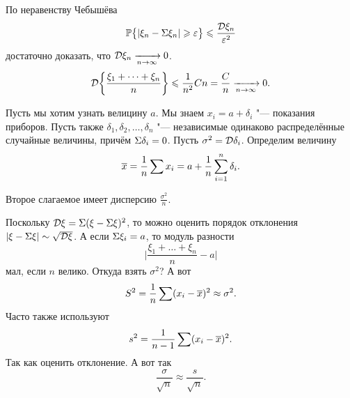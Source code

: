 По неравенству Чебышёва
\[
  \mathbb P\big\{|\xi_n - \Sigma\xi_n|\geqslant\varepsilon\big\} \leqslant \frac{\mathcal D\xi_n}{\varepsilon^2}
\]
достаточно доказать, что $\mathcal D\xi_n\xrightarrow[n\rightarrow\infty]{} 0$.
\[
  \mathcal D \bigg\{\frac{\xi_1+\dots+\xi_n}{n} \bigg\} \leqslant \frac1{n^2}C n = \frac Cn\xrightarrow[n\rightarrow\infty]{} 0.
\]

Пусть мы хотим узнать велицину $a$. Мы знаем $x_i = a+ \delta_i$ "--- показания приборов. Пусть также $\delta_1,\delta_2,\dots,\delta_n$ "--- независимые одинаково распределённые случайные величины, причём $\Sigma\delta_i = 0$. Пусть $\sigma^2= \mathcal D \delta_i$. Определим величину
\[
  \overline{x} = \frac1n \sum x_i = a+ \frac1n \sum\limits_{i = 1}^{n}\delta_i.
\]

Второе слагаемое имеет дисперсию $\frac{\sigma^2}n$.

Поскольку $\mathcal D\xi = \Sigma(\xi - \Sigma\xi)^2$, то можно оценить порядок отклонения $|\xi - \Sigma\xi|\sim \sqrt{\mathcal D\xi}$. А если $\Sigma\xi_i=a$, то модуль разности
\[
  \bigg|\frac{\xi_1 + \dots +\xi_n}{n} - a\bigg|
\]
мал, если $n$ велико. Откуда взять $\sigma^2$? А вот 
\[
  S^2 = \frac1n\sum (x_i-\overline{x})^2\approx \sigma^2.
\]
Часто также используют
\[
  s^2 = \frac1{n-1}\sum(x_i-\overline{x})^2.
\]
Так как оценить отклонение. А вот так
\[
  \frac\sigma{\sqrt n}\approx \frac s{\sqrt{n}}.
\]

